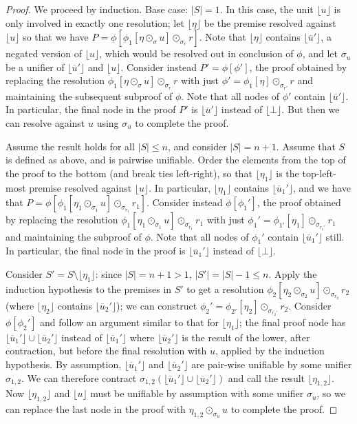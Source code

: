 \documentclass[12pt]{article}
\theoremstyle{definition}
\theoremstyle{remark}
\newcommand{\clause}[1]{ \lfloor{#1} \rfloor}
\begin{document}
\begin{proof}
We proceed by induction. Base case: $|S|=1$. In this case, the unit $\clause{u}$ is only involved in exactly one resolution; let $\clause{\eta}$ be the premise resolved against $\clause{u}$ so that we have $P=\phi[\phi_1[\eta \odot_{\sigma} u] \odot_{\sigma_r}  r]$. Note that $\clause{\eta}$ contains $\clause{\overline{u}'}$, a negated version of $\clause{u}$, which would be resolved out in conclusion of $\phi$, and let $\sigma_u$ be a unifier of $\clause{\overline{u}'}$ and $\clause{u}$. Consider instead $P'=\phi[\phi']$, the proof obtained by replacing the resolution $\phi_1[\eta \odot_{\sigma} u] \odot_{\sigma_r}  r$ with just $\phi' = \phi_1[\eta] \odot_{\sigma_{r'}} r$ and maintaining the subsequent subproof of $\phi$. Note that all nodes of $\phi'$ contain $\clause{\overline{u}'}$. In particular, the final node in the proof $P'$ is $\clause{\overline{u}'}$ instead of $\clause{\bot}$. But then we can resolve against $u$ using $\sigma_u$ to complete the proof.

Assume the result holds for all $|S|\le n$, and consider $|S|=n+1$. Assume that $S$ is defined as above, and is pairwise unifiable. Order the elements from the top of the proof to the bottom (and break ties left-right), so that $\clause{\eta_1}$ is the top-left-most premise resolved against $\clause{u}$. In particular, $\clause{\eta_1}$ contains $\clause{\overline{u}_1'}$, and we have that $P=\phi[\phi_1[\eta_1 \odot_{\sigma_1} u] \odot_{\sigma_{r_1}} r_1]$. Consider instead $\phi[\phi_1']$, the proof obtained by replacing the resolution $\phi_1[\eta_1 \odot_{\sigma_1} u] \odot_{\sigma_{r_1}} r_1$ with just $\phi_1' = \phi_{1'}[\eta_1] \odot_{\sigma_{r_1'}} r_1$ and maintaining the subproof of $\phi$. Note that all nodes of $\phi_1'$ contain $\clause{\overline{u}_1'}$ still. In particular, the final node in the proof is $\clause{\overline{u}_1'}$ instead of $\clause{\bot}$.  

Consider $S'=S\setminus\clause{\eta_1}$: since $|S|=n+1>1$, $|S'| = |S|-1 \le n$. Apply the induction hypothesis to the premises in $S'$ to get a  resolution $\phi_2[\eta_2 \odot_{\sigma_2} u] \odot_{\sigma_{r_2}} r_2$ (where $\clause{\eta_2}$ contains $\clause{\overline{u}_2'}$);  we can construct $\phi_2' = \phi_{2'}[\eta_2] \odot_{\sigma_{r_2'}} r_2$. Consider  $\phi[\phi_2']$ and follow an argument similar to that for $\clause{\eta_1}$; the final proof node has $\clause{\overline{u}_1'} \cup \clause{\overline{u}_2'}$ instead of $\clause{\overline{u}_1'}$ where $\clause{\overline{u}_2'}$ is the result of the lower, after contraction, but before the final resolution with $u$, applied by the induction hypothesis.  By assumption, $\clause{\overline{u}_1'}$ and $\clause{\overline{u}_2'}$ are pair-wise unifiable by some unifier $\sigma_{1,2}$. We can therefore contract $\sigma_{1,2}(\clause{\overline{u}_1'} \cup \clause{\overline{u}_2'})$ and call the result $\clause{\eta_{1,2}}$. Now $\clause{\eta_{1,2}}$ and $\clause{u}$ must be unifiable by assumption with some unifier $\sigma_u$, so we can replace the last node in the proof with $\eta_{1,2}\odot_{\sigma_u} u$ to complete the proof.
\end{proof}
\end{document}
